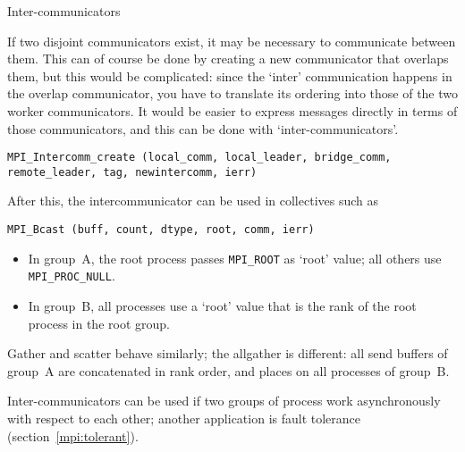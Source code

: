 
 {Inter-communicators}

If two disjoint communicators exist, it may be necessary to
communicate between them. This can of course be done by creating a new
communicator that overlaps them, but this would be complicated: since
the `inter' communication happens in the overlap communicator, you
have to translate its ordering into those of the two worker
communicators. It would be easier to express messages directly in
terms of those communicators, and this can be done with
`inter-communicators'.

\begin{lstlisting}
MPI_Intercomm_create (local_comm, local_leader, bridge_comm, remote_leader, tag, newintercomm, ierr)
\end{lstlisting}
After this, the intercommunicator can be used in collectives such as
\begin{lstlisting}
MPI_Bcast (buff, count, dtype, root, comm, ierr)
\end{lstlisting}
\begin{itemize}
\item In group~A, the root process passes \lstinline$MPI_ROOT$ as
  `root' value; all others use \lstinline$MPI_PROC_NULL$.
\item In group~B, all processes use a `root' value that is the
  rank of the root process in the root group.
\end{itemize}
Gather and scatter behave similarly; the allgather is different: all
send buffers of group~A are concatenated in rank order, and places on
all processes of group~B.

Inter-communicators can be used if two groups of process work
asynchronously with respect to each other; another application is
fault tolerance (section~\ref{mpi:tolerant}).

